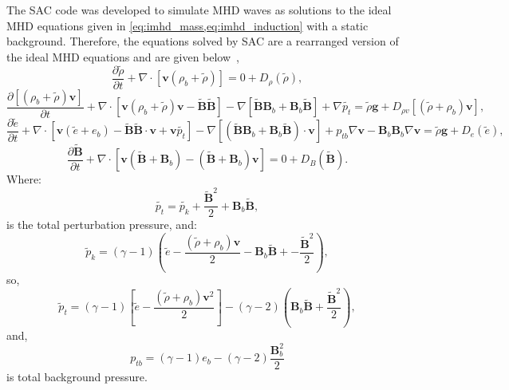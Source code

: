 \documentclass[a4paper,12pt,fourier,authoryear,custommargin]{Classes/PhDThesisPSnPDF}
\begin{document}
The SAC code was developed to simulate MHD waves as solutions to the ideal MHD equations given in \cref{eq:imhd_mass,eq:imhd_induction} with a static background.
Therefore, the equations solved by SAC are a rearranged version of the ideal MHD equations and are given below~\citep[taken from][]{shelyag2008},
\begin{equation}
\frac{\partial\tilde{\rho}}{\partial t}+\nabla\cdot[\mathbf{v}(\rho_{b}+\tilde{\rho})]=0+D_{\rho}(\tilde{\rho}),
\end{equation}
\begin{equation}
\frac{\partial[(\rho_{b}+\tilde{\rho})\mathbf{v}]}{\partial t}+\nabla\cdot[\mathbf{v}(\rho_{b}+\tilde{\rho})\mathbf{v}-\mathbf{\tilde{B}\tilde{B}}]-\nabla[\mathbf{\tilde{B}}\mathbf{B}_{b}+\mathbf{B}_{b}\mathbf{\tilde{B}}]+\nabla\tilde{p_{t}}=\tilde{\rho}\mathbf{g}+D_{\rho v}[(\tilde{\rho}+\rho_{b})\mathbf{v}],
\end{equation}
\begin{equation}
\frac{\partial\tilde{e}}{\partial t}+\nabla\cdot[\mathbf{v}(\tilde{e}+e_{b})-\mathbf{\tilde{B}\tilde{B}}\cdot\mathbf{v}+\mathbf{v}\tilde{p_{t}}]-\nabla[(\mathbf{\tilde{B}B}_{b}+\mathbf{B}_{b}\mathbf{\tilde{B}})\cdot\mathbf{v}]+p_{tb}\nabla\mathbf{v}-\mathbf{B}_{b}\mathbf{B}_{b}\nabla\mathbf{v}=\tilde{\rho}\mathbf{g}+D_{e}(\tilde{e}),
\end{equation}
\begin{equation}
\frac{\partial\mathbf{\tilde{B}}}{\partial t}+\nabla\cdot[\mathbf{v}(\mathbf{\tilde{B}}+\mathbf{B}_{b})-(\mathbf{\tilde{B}}+\mathbf{B}_{b})\mathbf{v}]=0+D_{B}(\mathbf{\tilde{B}}).
\end{equation}
Where:
\begin{equation}
\tilde{p_{t}}=\tilde{p_{k}}+\frac{\tilde{\mathbf{B}}^{2}}{2}+\mathbf{B}_{b}\mathbf{\tilde{B}},
\end{equation}
is the total perturbation pressure, and: 
\begin{equation}
\tilde{p}_{k}=(\gamma-1)\left(\tilde{e}-\frac{(\tilde{\rho}+\rho_{b})\mathbf{v}}{2}-\mathbf{B}_b\mathbf{\tilde{B}}+-\frac{\tilde{\mathbf{B}}^{2}}{2}\right),
\end{equation}
so,
\begin{equation}
\tilde{p}_{t}=(\gamma-1)\left[\tilde{e}-\frac{(\tilde{\rho}+\rho_{b})\mathbf{v}^{2}}{2}\right]-(\gamma-2)\left(\mathbf{B}_{b}\mathbf{\tilde{B}}+\frac{\tilde{\mathbf{B}}^{2}}{2}\right),
\end{equation}
and,
\begin{equation}
p_{tb}=(\gamma-1)e_{b}-(\gamma-2)\frac{\mathbf{B}_{b}^{2}}{2}
\end{equation}
is total background pressure.
\end{document}
